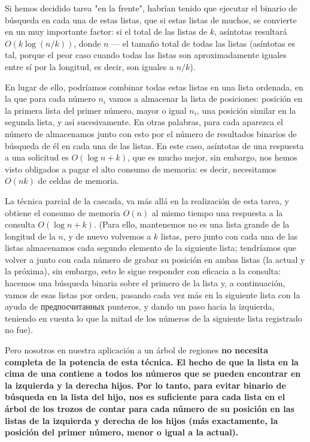 Si hemos decidido tarea "en la frente", habrían tenido que ejecutar el binario de búsqueda en cada una de estas listas, que si estas listas de muchos, se convierte en un muy importante factor: si el total de las listas de $k$, asíntotas resultará $O (k \log(n/k))$, donde $n$ --- el tamaño total de todas las listas (asíntotas es tal, porque el peor caso cuando todas las listas son aproximadamente iguales entre sí por la longitud, es decir, son iguales a $n/k$).

En lugar de ello, podríamos combinar todas estas listas en una lista ordenada, en la que para cada número $n_i$ vamos a almacenar la lista de posiciones: posición en la primera lista del primer número, mayor o igual $n_i$, una posición similar en la segunda lista, y así sucesivamente. En otras palabras, para cada aparezca el número de almacenamos junto con esto por el número de resultados binarios de búsqueda de él en cada una de las listas. En este caso, asíntotas de una respuesta a una solicitud es $O (\log n + k)$, que es mucho mejor, sin embargo, nos hemos visto obligados a pagar el alto consumo de memoria: es decir, necesitamos $O (nk)$ de celdas de memoria.

La técnica parcial de la cascada, va más allá en la realización de esta tarea, y obtiene el consumo de memoria $O (n)$ al mismo tiempo una respuesta a la consulta $O (\log n + k)$. (Para ello, mantenemos no es una lista grande de la longitud de la $n$, y de nuevo volvemos a $k$ listas, pero junto con cada una de las listas almacenamos cada segundo elemento de la siguiente lista; tendríamos que volver a junto con cada número de grabar su posición en ambas listas (la actual y la próxima), sin embargo, esto le sigue responder con eficacia a la consulta: hacemos una búsqueda binaria sobre el primero de la lista y, a continuación, vamos de esas listas por orden, pasando cada vez más en la siguiente lista con la ayuda de предпосчитанных punteros, y dando un paso hacia la izquierda, teniendo en cuenta lo que la mitad de los números de la siguiente lista registrado no fue).

Pero nosotros en nuestra aplicación a un árbol de regiones \bf{no necesita} completa de la potencia de esta técnica. El hecho de que la lista en la cima de una contiene a todos los números que se pueden encontrar en la izquierda y la derecha hijos. Por lo tanto, para evitar binario de búsqueda en la lista del hijo, nos es suficiente para cada lista en el árbol de los trozos de contar para cada número de su posición en las listas de la izquierda y derecha de los hijos (más exactamente, la posición del primer número, menor o igual a la actual).

